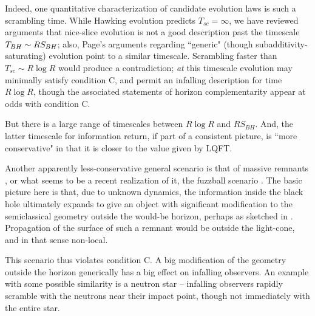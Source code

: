 Indeed, one quantitative characterization of candidate evolution laws is such a scrambling time.  While Hawking evolution predicts $T_{sc}=\infty$,  we have reviewed arguments  that nice-slice evolution is not a good description past the timescale ${T_{BH}}\sim R S_{BH}$; also, Page's arguments regarding ``generic" (though subadditivity-saturating) evolution point to a similar timescale.  Scrambling faster than $T_{sc}\sim R\log R$ would produce a contradiction; {\it at} this  timescale evolution may minimally satisfy condition C, and permit an infalling description for time $R\log R$, though the associated statements of horizon complementarity appear at odds with condition C.


 But there is a large range of  timescales between $R\log R$ and $R S_{BH}$.  And, the latter  timescale for information return, if part of a consistent picture, is ``more conservative" in that it is closer to the value given by LQFT.



Another apparently less-conservative general scenario is that of massive remnants , or what seems to be a recent realization of it, the fuzzball scenario .  The basic picture here is that, due to unknown dynamics, the information inside the black hole ultimately expands to give an object with significant modification to the semiclassical geometry outside the would-be horizon, perhaps as sketched in \MRevol.  Propagation of the surface of such a remnant would be outside the light-cone, and in that sense non-local.  

This scenario thus violates condition C.  A big modification of the geometry outside the horizon generically has a big effect on infalling observers.  An example with some possible similarity is a neutron star -- infalling observers rapidly scramble with the neutrons near their impact point, though not immediately with the entire star.

